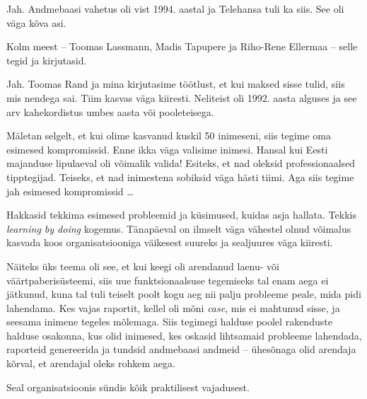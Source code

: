 Jah. Andmebaasi vahetus oli vist 1994. aastal ja Telehansa tuli ka siis. See
oli väga kõva asi.


Kolm meest -- Toomas Lassmann, Madis Tapupere ja Riho-Rene 
Ellermaa -- selle tegid ja kirjutasid. 


Jah. Toomas Rand ja mina kirjutasime töötlust, et kui 
maksed sisse tulid, siis mis nendega sai. Tiim kasvas väga kiiresti. Neliteist oli 
1992. aasta alguses ja see arv kahekordistus umbes 
aasta või pooleteisega. 


Mäletan selgelt, et kui olime kasvanud kuskil 50 inimeseni, siis tegime 
oma esimesed kompromissid. Enne ikka väga valisime inimesi. Hansal kui Eesti majanduse lipulaeval oli võimalik valida! 
Esiteks, et nad oleksid professionaalsed tipptegijad. Teiseks, et nad inimestena sobiksid väga 
hästi tiimi. Aga siis tegime jah esimesed kompromissid \ldots

Hakkasid tekkima esimesed probleemid ja küsimused, kuidas asja hallata. Tekkis \emph{learning by doing} kogemus. Tänapäeval on ilmselt väga vähestel olnud 
võimalus kasvada koos organisatsiooniga väikesest suureks ja sealjuures väga kiiresti. 

Näiteks üks teema oli see, et kui keegi oli arendanud 
laenu- või väärtpaberisüsteemi, siis uue 
funktsionaalsuse tegemiseks tal enam aega ei jätkunud, kuna tal tuli teiselt poolt kogu aeg nii palju 
probleeme peale, mida pidi lahendama. Kes vajas 
raportit, kellel oli mõni \emph{case}, mis ei mahtunud sisse, 
ja seesama inimene tegeles mõlemaga. Siis tegimegi halduse poolel rakenduste halduse osakonna, kus olid 
inimesed, kes oskasid lihtsamaid probleeme lahendada, raporteid genereerida 
ja tundsid andmebaasi andmeid -- ühesõnaga olid arendaja 
kõrval, et arendajal oleks rohkem aega. 


Seal organisatsioonis sündis kõik praktilisest vajadusest. 

